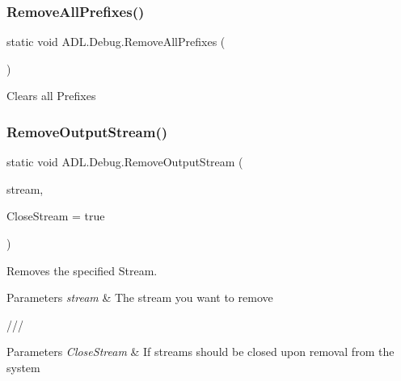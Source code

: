 \subsubsection{\texorpdfstring{Remove\+All\+Prefixes()}{RemoveAllPrefixes()}}
{\footnotesize\ttfamily static void A\+D\+L.\+Debug.\+Remove\+All\+Prefixes (\begin{DoxyParamCaption}{ }\end{DoxyParamCaption})\hspace{0.3cm}{\ttfamily [static]}}



Clears all Prefixes 

\mbox{\label{class_a_d_l_1_1_debug_a72625a03910e11ca410548f07ecf8e32}} 
\subsubsection{\texorpdfstring{Remove\+Output\+Stream()}{RemoveOutputStream()}}
{\footnotesize\ttfamily static void A\+D\+L.\+Debug.\+Remove\+Output\+Stream (\begin{DoxyParamCaption}\item[{\mbox{\hyperlink{class_a_d_l_1_1_log_stream}{Log\+Stream}}}]{stream,  }\item[{bool}]{Close\+Stream = {\ttfamily true} }\end{DoxyParamCaption})\hspace{0.3cm}{\ttfamily [static]}}



Removes the specified Stream. 


\begin{DoxyParams}{Parameters}
{\em stream} & The stream you want to remove\\
\hline
\end{DoxyParams}
/// 
\begin{DoxyParams}{Parameters}
{\em Close\+Stream} & If streams should be closed upon removal from the system\\
\hline
\end{DoxyParams}
\mbox{\label{class_a_d_l_1_1_debug_a779aa6ed8a563666beeea29b73058a99}} 
